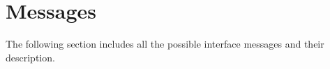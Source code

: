 \chapter{Messages}
\label{ch:messages}

The following section includes all the possible interface messages and their description.



\newpage